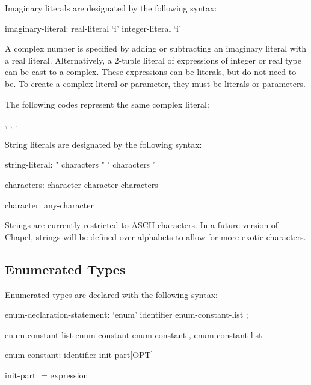 Imaginary literals are designated by the following syntax:
\begin{syntax}
imaginary-literal:
  real-literal `i'
  integer-literal `i'
\end{syntax}

A complex number is specified by adding or subtracting an imaginary
literal with a real literal.  Alternatively, a 2-tuple literal of
expressions of integer or real type can be cast to a complex.  These
expressions can be literals, but do not need to be.  To create a
complex literal or parameter, they must be literals or parameters.

\begin{example}
The following codes represent the same complex literal:
\begin{center}
, \hspace{1pc} , \hspace{1pc}
.
\end{center}
\end{example}

String literals are designated by the following syntax:
\begin{syntax}
string-literal:
  " characters "
  ' characters '

characters:
  character
  character characters

character:
  any-character
\end{syntax}

\begin{implementation}
Strings are currently restricted to ASCII characters.  In a future
version of Chapel, strings will be defined over alphabets to allow for
more exotic characters.
\end{implementation}

\subsection{Enumerated Types}
\label{Enumerated_Types}

Enumerated types are declared with the following syntax:
\begin{syntax}
enum-declaration-statement:
  `enum' identifier { enum-constant-list } ;

enum-constant-list
  enum-constant
  enum-constant , enum-constant-list

enum-constant:
  identifier init-part[OPT]

init-part:
  = expression
\end{syntax}


